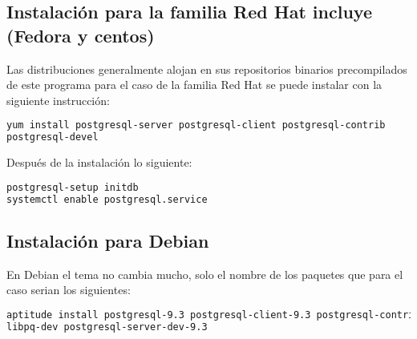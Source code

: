\documentclass{article}
\begin{document}
\subsection{Instalación para la familia Red Hat incluye (Fedora y centos)}
Las distribuciones generalmente alojan en sus repositorios binarios precompilados de este programa para el caso de la familia Red Hat se puede instalar con la siguiente instrucción:\\
\begin{lstlisting}[language=bash, frame=single]
yum install postgresql-server postgresql-client postgresql-contrib 
postgresql-devel
\end{lstlisting}
Después de la instalación lo siguiente:\\
\begin{lstlisting}[language=bash, frame=single]
postgresql-setup initdb
systemctl enable postgresql.service
\end{lstlisting}
\subsection{Instalación para Debian}
En Debian el tema no cambia mucho, solo el nombre de los paquetes que para el caso serian los siguientes:\\
\begin{lstlisting}[language=bash, frame=single]
aptitude install postgresql-9.3 postgresql-client-9.3 postgresql-contrib-9.3 
libpq-dev postgresql-server-dev-9.3
\end{lstlisting}
\end{document}
